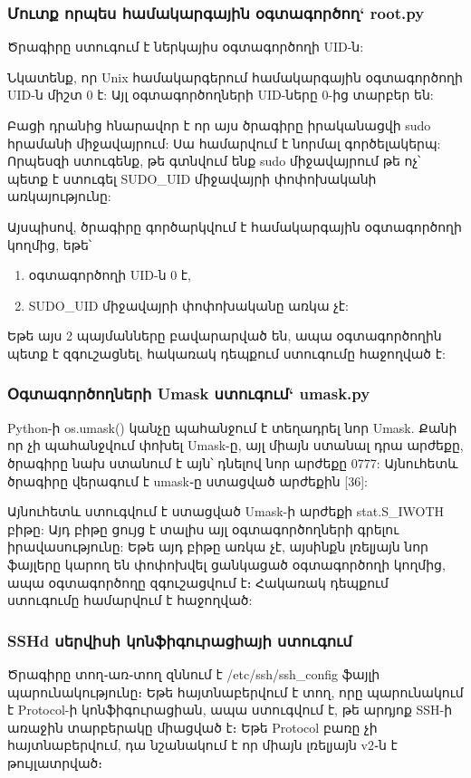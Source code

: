 \documentclass[a4paper,12pt]{article}
\begin{document}
\begin{sloppypar}
\subsubsection{Մուտք որպես համակարգային օգտագործող` root.py}


Ծրագիրը ստուգում է ներկայիս օգտագործողի UID-ն:

Նկատենք, որ Unix համակարգերում համակարգային օգտագործողի UID-ն միշտ 0 է:
Այլ օգտագործողների UID-ները 0-ից տարբեր են:

Բացի դրանից հնարավոր է որ այս ծրագիրը իրականացվի sudo հրամանի միջավայրում:
Սա համարվում է նորմալ գործելակերպ: Որպեսզի ստուգենք, թե գտնվում ենք sudo
միջավայրում թե ոչ՝ պետք է ստուգել SUDO\_UID միջավայրի փոփոխականի
առկայությունը:

Այսպիսով, ծրագիրը գործարկվում է համակարգային օգտագործողի կողմից, եթե՝
\begin{enumerate}
\item օգտագործողի UID-ն 0 է,
\item SUDO\_UID միջավայրի փոփոխականը առկա չէ:
\end{enumerate}

Եթե այս 2 պայմանները բավարարված են, ապա օգտագործողին պետք է զգուշացնել,
հակառակ դեպքում ստուգումը հաջողված է:


\subsubsection{Օգտագործողների Umask ստուգում` umask.py}


Python-ի os.umask() կանչը պահանջում է տեղադրել նոր Umask.
Քանի որ չի պահանջվում փոխել Umask-ը, այլ միայն ստանալ դրա արժեքը,
ծրագիրը նախ ստանում է այն՝ դնելով նոր արժեքը 0777: Այնուհետև
ծրագիրը վերագում է umask֊ը ստացված արժեքին [36]:

Այնուհետև ստուգվում է ստացված Umask-ի արժեքի stat.S\_IWOTH բիթը:
Այդ բիթը ցույց է տալիս այլ օգտագործողների գրելու իրավասությունը:
Եթե այդ բիթը առկա չէ, այսինքն լռելյայն նոր ֆայլերը կարող են
փոփոխվել ցանկացած օգտագործողի կողմից, ապա օգտագործողը զգուշացվում է։
Հակառակ դեպքում ստուգումը համարվում է հաջողված:


\subsubsection{SSHd սերվիսի կոնֆիգուրացիայի ստուգում}


Ծրագիրը տող֊առ֊տող զննում է /etc/ssh/ssh\_config ֆայլի պարունակությունը։
Եթե հայտնաբերվում է տող, որը պարունակում է Protocol-ի կոնֆիգուրացիան,
ապա ստուգվում է, թե արդյոք SSH-ի առաջին տարբերակը միացված է։
Եթե Protocol բառը չի հայտնաբերվում, դա նշանակում է որ միայն լռելյայն
v2֊ն է թույլատրված։


\end{sloppypar}
\end{document}

